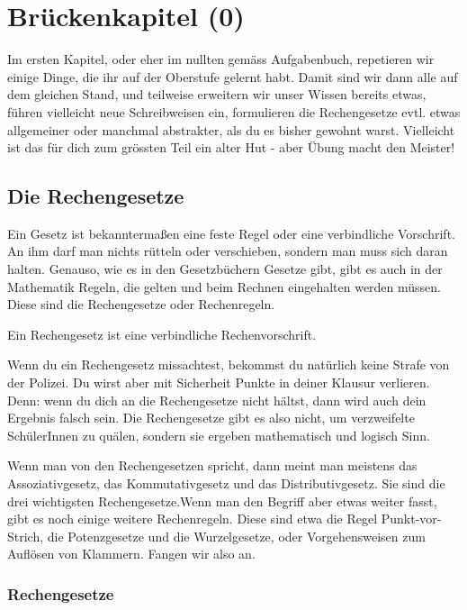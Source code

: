 \chapter{Brückenkapitel (0)}
Im ersten Kapitel, oder eher im nullten gemäss Aufgabenbuch, repetieren wir einige Dinge, die ihr auf der Oberstufe gelernt habt. Damit sind wir dann alle auf dem gleichen Stand, und teilweise erweitern wir unser Wissen bereits etwas, führen vielleicht neue Schreibweisen ein, formulieren die Rechengesetze evtl. etwas allgemeiner oder manchmal abstrakter, als du es bisher gewohnt warst. Vielleicht ist das für dich zum grössten Teil ein alter Hut - aber Übung macht den Meister!

\section{Die Rechengesetze}
Ein Gesetz ist bekanntermaßen eine feste Regel oder eine verbindliche Vorschrift. An ihm darf man nichts rütteln oder verschieben, sondern man muss sich daran halten. Genauso, wie es in den Gesetzbüchern Gesetze gibt, gibt es auch in der Mathematik Regeln, die gelten und beim Rechnen eingehalten werden müssen. Diese sind die Rechengesetze oder Rechenregeln.

\begin{tcolorbox}[colback=green!10!white,colframe=green!70!black,title=Rechengesetz,width=.9\linewidth]
		Ein Rechengesetz ist eine verbindliche Rechenvorschrift.
\end{tcolorbox}

Wenn du ein Rechengesetz missachtest, bekommst du natürlich keine Strafe von der Polizei. Du wirst aber mit Sicherheit Punkte in deiner Klausur verlieren. Denn: wenn du dich an die Rechengesetze nicht hältst, dann wird auch dein Ergebnis falsch sein. Die Rechengesetze gibt es also nicht, um verzweifelte SchülerInnen zu quälen, sondern sie ergeben mathematisch und logisch Sinn.

Wenn man von den Rechengesetzen spricht, dann meint man meistens das Assoziativgesetz, das Kommutativgesetz und das Distributivgesetz. Sie sind die drei wichtigsten Rechengesetze.Wenn man den Begriff aber etwas weiter fasst, gibt es noch einige weitere Rechenregeln. Diese sind etwa die Regel Punkt-vor-Strich, die Potenzgesetze und die Wurzelgesetze, oder Vorgehensweisen zum Auflösen von Klammern. Fangen wir also an.

\subsection{Rechengesetze}

